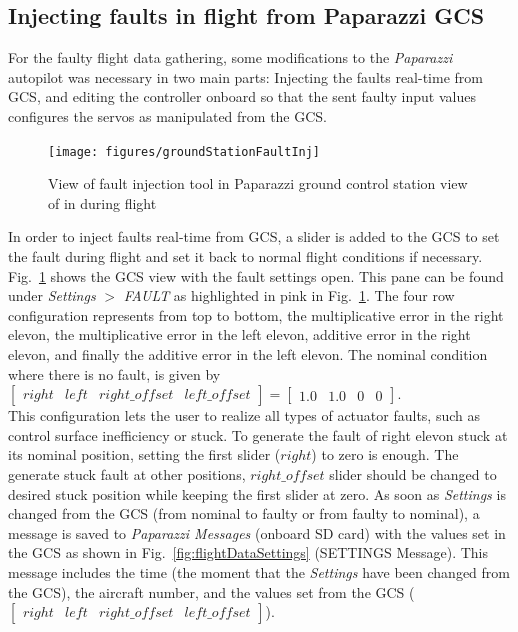 \subsection{Injecting faults in flight from Paparazzi GCS}

For the faulty flight data gathering, some modifications to the \emph{Paparazzi} autopilot was necessary in two main parts: Injecting the faults real-time from GCS, and editing the controller onboard so that the sent faulty input values configures the servos as manipulated from the GCS.

\begin{figure}
\begin{center}
\texttt{[image: figures/groundStationFaultInj]}    %
\caption{View of fault injection tool in Paparazzi ground control station view of in during flight} 
\label{fig:groundStationFaultInj}
\end{center}
\end{figure}

In order to inject faults real-time from GCS, a slider is added to the GCS to set the fault during flight and set it back to normal flight conditions if necessary.
Fig.~\ref{fig:groundStationFaultInj} shows the GCS view with the fault settings open. 
This pane can be found under  \emph{Settings} $>$  \emph{FAULT} as highlighted in pink in Fig.~\ref{fig:groundStationFaultInj}. 
The four row configuration represents from top to bottom, the multiplicative error in the right elevon, the multiplicative error in the left elevon, additive error in the right elevon, and finally the additive error in the left elevon. 
The nominal condition where there is no fault, is given by $[\begin{matrix}right & left & right\_offset &left\_offset\end{matrix}] = [\begin{matrix} 1.0 & 1.0 & 0 & 0\end{matrix}]$. \\
This configuration lets the user to realize all types of actuator faults, such as control surface inefficiency or stuck. 
To generate the fault of right elevon stuck at its nominal position, setting the first slider ($right$) to zero is enough. 
The generate stuck fault at other positions, $right\_offset$ slider should be changed to desired stuck position while keeping the first slider at zero.
As soon as \emph{Settings} is changed from the GCS (from nominal to faulty or from faulty to nominal), a message is saved to \emph{Paparazzi Messages} (onboard SD card) with the values set in the GCS as shown in Fig.~\ref{fig:flightDataSettings} (SETTINGS Message). 
This message includes the time (the moment that the \emph{Settings} have been changed from the GCS), the aircraft number, and the values set from the GCS ($[\begin{matrix}right & left & right\_offset &left\_offset\end{matrix}]$).

